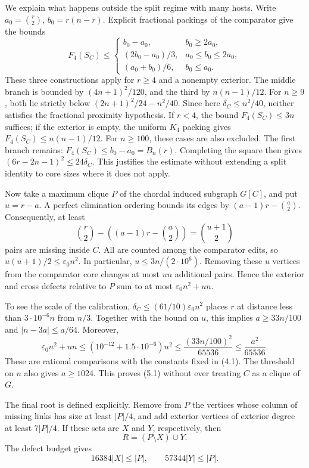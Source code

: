 \documentclass[english,11pt,a4paper]{article}
\newcounter{none}
\begin{document}
We explain what happens outside the split regime with many hosts. Write \(a_0=\binom r2\), \(b_0=r(n-r)\). Explicit fractional packings of the comparator give the bounds \[
F_4(S_C)\le
\begin{cases}
b_0-a_0,&b_0\ge2a_0,\\
(2b_0-a_0)/3,&a_0\le b_0\le2a_0,\\
(a_0+b_0)/6,&b_0\le a_0.
\end{cases}
\tag{5.1a}
\] These three constructions apply for \(r\ge4\) and a nonempty exterior. The middle branch is bounded by \((4n+1)^2/120\), and the third by \(n(n-1)/12\). For \(n\ge9\), both lie strictly below \((2n+1)^2/24-n^2/40\). Since here \(\delta_C\le n^2/40\), neither satisfies the fractional proximity hypothesis. If \(r<4\), the bound \(F_4(S_C)\le3n\) suffices; if the exterior is empty, the uniform \(K_4\) packing gives \(F_4(S_C)\le n(n-1)/12\). For \(n\ge100\), these cases are also excluded. The first branch remains: \(F_4(S_C)\le b_0-a_0=B_n(r)\). Completing the square then gives \((6r-2n-1)^2\le24\delta_C\). This justifies the estimate without extending a split identity to core sizes where it does not apply.

Now take a maximum clique \(P\) of the chordal induced subgraph \(G[C]\), and put \(u=r-a\). A perfect elimination ordering bounds its edges by \((a-1)r-\binom a2\). Consequently, at least \[
\binom r2-\left((a-1)r-\binom a2\right)
=\binom{u+1}{2}
\] pairs are missing inside \(C\). All are counted among the comparator edits, so \(u(u+1)/2\le\varepsilon_0n^2\). In particular, \(u\le3n/(2\cdot10^6)\). Removing these \(u\) vertices from the comparator core changes at most \(un\) additional pairs. Hence the exterior and cross defects relative to \(P\) sum to at most \(\varepsilon_0n^2+un\).

To see the scale of the calibration, \(\delta_C\le(61/10)\varepsilon_0n^2\) places \(r\) at distance less than \(3\cdot10^{-6}n\) from \(n/3\). Together with the bound on \(u\), this implies \(a\ge33n/100\) and \(|n-3a|\le a/64\). Moreover, \[
\varepsilon_0n^2+un\le(10^{-12}+1.5\cdot10^{-6})n^2
\le\frac{(33n/100)^2}{65536}\le\frac{a^2}{65536}.
\] These are rational comparisons with the constants fixed in (4.1). The threshold on \(n\) also gives \(a\ge1024\). This proves (5.1) without ever treating \(C\) as a clique of \(G\).

The final root is defined explicitly. Remove from \(P\) the vertices whose column of missing links has size at least \(|P|/4\), and add exterior vertices of exterior degree at least \(7|P|/4\). If these sets are \(X\) and \(Y\), respectively, then \[
R=(P\setminus X)\cup Y.
\tag{5.2}
\] The defect budget gives \[
16384|X|\le |P|,\qquad 57344|Y|\le |P|.
\tag{5.3}
\] 
\end{document}
